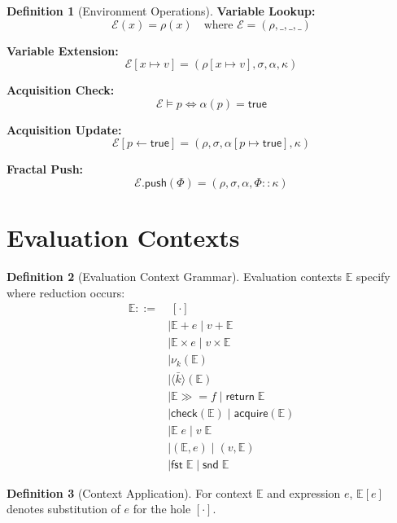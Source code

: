 \documentclass[11pt,twoside,openright]{book}
\theoremstyle{definition}
\newtheorem{definition}{Definition}[chapter]
\theoremstyle{plain}
\theoremstyle{remark}
\newcommand{\noe}[1]{\nu_{#1}}
\newcommand{\rpmret}{\mathsf{return}}
\newcommand{\rpmbind}{\mathbin{\gg\!=}}
\newcommand{\Frac}{\Phi}
\begin{document}
\begin{definition}[Environment Operations]
\label{def:env-ops}
\textbf{Variable Lookup:}
\[
\mathcal{E}(x) = \rho(x) \quad \text{where } \mathcal{E} = (\rho, \_, \_, \_)
\]

\textbf{Variable Extension:}
\[
\mathcal{E}[x \mapsto v] = (\rho[x \mapsto v], \sigma, \alpha, \kappa)
\]

\textbf{Acquisition Check:}
\[
\mathcal{E} \models p \iff \alpha(p) = \mathsf{true}
\]

\textbf{Acquisition Update:}
\[
\mathcal{E}[p \leftarrow \mathsf{true}] = (\rho, \sigma, \alpha[p \mapsto \mathsf{true}], \kappa)
\]

\textbf{Fractal Push:}
\[
\mathcal{E}.\mathsf{push}(\Frac) = (\rho, \sigma, \alpha, \Frac :: \kappa)
\]
\end{definition}

\section{Evaluation Contexts}

\begin{definition}[Evaluation Context Grammar]
\label{def:eval-context}
Evaluation contexts $\mathbb{E}$ specify where reduction occurs:
\begin{align}
\mathbb{E} ::=&\; [\cdot] \\
    &\mid \mathbb{E} + e \mid v + \mathbb{E} \\
    &\mid \mathbb{E} \times e \mid v \times \mathbb{E} \\
    &\mid \noe{k}(\mathbb{E}) \\
    &\mid \langle \bar{k} \rangle(\mathbb{E}) \\
    &\mid \mathbb{E} \rpmbind f \mid \rpmret\; \mathbb{E} \\
    &\mid \mathsf{check}(\mathbb{E}) \mid \mathsf{acquire}(\mathbb{E}) \\
    &\mid \mathbb{E}\; e \mid v\; \mathbb{E} \\
    &\mid (\mathbb{E}, e) \mid (v, \mathbb{E}) \\
    &\mid \mathsf{fst}\; \mathbb{E} \mid \mathsf{snd}\; \mathbb{E}
\end{align}
\end{definition}

\begin{definition}[Context Application]
\label{def:context-app}
For context $\mathbb{E}$ and expression $e$, $\mathbb{E}[e]$ denotes substitution of $e$ for the hole $[\cdot]$.
\end{definition}
\end{document}
